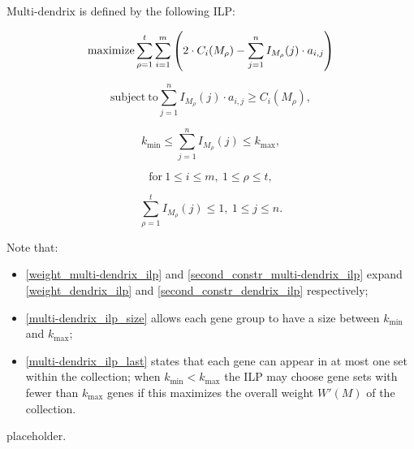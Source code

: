 \begin{definition}
    $\mathrm{Multi}$-$\mathrm{dendrix}$ is defined by the following ILP:

    \begin{equation} \label{weight_multi-dendrix_ilp}
        \mathrm{maximize} \sum_{\rho = 1}^t {\sum_{i = 1}^m {\left(2 \cdot C_i(M_\rho) - \sum_{j = 1}^n I_{M_\rho}(j) \cdot a_{i, j}\right)}}
    \end{equation}

    \begin{equation} \label{second_constr_multi-dendrix_ilp}
        \mathrm{subject \ to} \sum_{j = 1}^n I_{M_\rho}(j) \cdot {a_{i, j}} \ge C_i(M_\rho),
    \end{equation}

    \begin{equation} \label{multi-dendrix_ilp_size}
        k_\mathrm{min} \le \sum_{j = 1}^n {I_{M_\rho}(j)} \le k_\mathrm{max},
    \end{equation}
    
    \begin{equation*}
        \mathrm{for\ } 1 \le i \le m, \ 1 \le \rho \le t,
    \end{equation*}

    \begin{equation} \label{multi-dendrix_ilp_last}
        \sum_{\rho = 1}^t{I_{M_\rho}(j)} \le 1, \ 1 \le j \le n.
    \end{equation}
\end{definition}

Note that:

\begin{itemize}
    \item \cref{weight_multi-dendrix_ilp} and \cref{second_constr_multi-dendrix_ilp} expand \cref{weight_dendrix_ilp} and \cref{second_constr_dendrix_ilp} respectively;
    \item \cref{multi-dendrix_ilp_size} allows each gene group to have a size between $k_\mathrm{min}$ and $k_\mathrm{max}$;
    \item \cref{multi-dendrix_ilp_last} states that each gene can appear in at most one set within the collection; when $k_\mathrm{min} < k_\mathrm{max}$ the ILP may choose gene sets with fewer than $k_\mathrm{max}$ genes if this maximizes the overall weight $W'(M)$ of the collection.
\end{itemize}

placeholder. 

